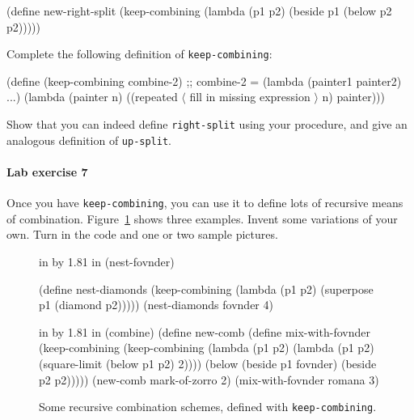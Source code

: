 \documentclass[11pt]{article}
\begin{document}
\beginlisp
(define new-right-split
  (keep-combining
   (lambda (p1 p2)
     (beside p1 (below p2 p2)))))
\endlisp

\noindent
Complete the following definition of {\tt keep-combining}:

\beginlisp
(define (keep-combining combine-2)
  ;; combine-2 = (lambda (painter1 painter2) ...)
  (lambda (painter n)
    ((repeated
      {\rm $\langle$ fill in missing expression $\rangle$}
      n)
     painter)))
\endlisp

\noindent
Show that you can indeed define {\tt right-split} using your
procedure, and give an analogous definition of {\tt up-split}.


\paragraph{Lab exercise 7}
Once you have {\tt keep-combining}, you can use it to define lots of
recursive means of combination.  Figure~\ref{keep-combining} shows
three examples.  Invent some variations of your own.  Turn in the code
and one or two sample pictures.

\begin{figure}
 in by 1.81 in (nest-fovnder)

\beginlisp
                     (define nest-diamonds
                       (keep-combining
                        (lambda (p1 p2) (superpose p1 (diamond p2)))))
\null
                     (nest-diamonds fovnder 4)
\endlisp

 in by 1.81 in (combine)
\beginlisp
     (define new-comb                              (define mix-with-fovnder
       (keep-combining                               (keep-combining
        (lambda (p1 p2)                               (lambda (p1 p2)
          (square-limit (below p1 p2) 2))))             (below (beside p1
                                                                       fovnder)
                                                               (beside p2 p2)))))
\null                                                      
     (new-comb mark-of-zorro 2)                     (mix-with-fovnder romana 3)
\endlisp
\caption{{\protect\footnotesize
Some recursive combination schemes, defined with {\tt keep-combining}.}}
\label{keep-combining}
\end{figure} 
\end{document}
